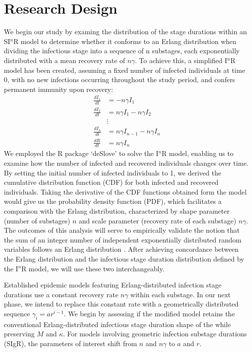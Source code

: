 \documentclass[12pt]{article}
\begin{document}
\section*{Research Design}
We begin our study by examing the distribution of the stage durations within an SI$^n$R model to determine whether it conforms to an Erlang distribution when dividing the infectious stage into a sequence of n substages, each exponentially distributed with a mean recovery rate of $n\gamma$. To achieve this, a simplified I$^n$R model has been created, assuming a fixed number of infected individuals at time 0, with no new infections occurring throughout the study period, and confers permanent immunity upon recovery:
\begin{align*}
    \frac{dI_1}{dt} &= -n \gamma I_1 \\
    \frac{dI_2}{dt} &= n \gamma I_1 - n \gamma I_2 \\
    &\vdots \\
    \frac{dI_n}{dt} &= n \gamma I_{n-1} - n \gamma I_n \\
    \frac{dR}{dt} &= n \gamma I_n 
\end{align*}
We employed the R package ‘deSlove’ to solve the I$^n$R model, enabling us to examine how the number of infected and recovered individuals changes over time. By setting the initial number of infected individuals to 1, we derived the cumulative distribution function (CDF) for both infected and recovered individuals. Taking the derivative of the CDF functions obtained form the model would give us the probability density function (PDF), which facilitates a comparison with the Erlang distribution, characterized by shape parameter (number of substages) $n$ and scale parameter (recovery rate of each substage) $n\gamma$. The outcomes of this analysis will serve to empirically validate the notion that the sum of an integer number of independent exponentially distributed random variables follows an Erlang distribution \cite{Tummal2011}. After achieving concordance between the Erlang distribution and the infectious stage duration distribution defined by the I$^n$R model, we will use these two interchangeably.
\par
Established epidemic models featuring Erlang-distributed infection stage durations use a constant recovery rate $n\gamma$ within each substage. In our next phase, we intend to replace this constant rate with a geometrically distributed sequence $\gamma_i = ar^{i-1}$. We begin by assessing if the modified model retains the conventional Erlang-distributed infectious stage duration shape of the while preserving $M$ and $\kappa$. For models involving geometric infection substage durations (SIgR), the parameters of interest shift from $n$ and $n\gamma$ to $a$ and $r$.
\end{document}
